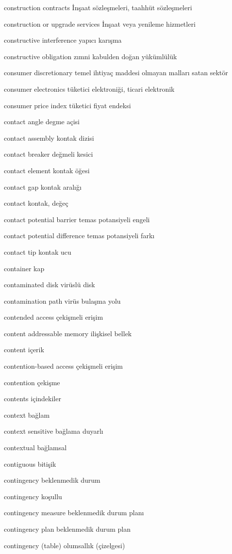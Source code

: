\documentclass[12pt,fleqn]{article}\usepackage{../../common}
\begin{document}
construction contracts İnşaat sözleşmeleri, taahhüt sözleşmeleri

construction or upgrade services İnşaat veya yenileme hizmetleri

constructive interference yapıcı karışma

constructive obligation zımni kabulden doğan yükümlülük

consumer discretionary temel ihtiyaç maddesi olmayan malları satan sektör

consumer electronics tüketici elektroniği, ticari elektronik

consumer price index tüketici fiyat endeksi

contact angle degme açisi

contact assembly kontak dizisi

contact breaker değmeli kesici

contact element kontak öğesi

contact gap kontak aralığı

contact kontak, değeç

contact potential barrier temas potansiyeli engeli

contact potential difference temas potansiyeli farkı

contact tip kontak ucu

container kap

contaminated disk virüslü disk

contamination path virüs bulaşma yolu

contended access çekişmeli erişim

content addressable memory ilişkisel bellek

content içerik

contention-based access çekişmeli erişim

contention çekişme

contents içindekiler

context bağlam

context sensitive bağlama duyarlı

contextual bağlamsal

contiguous bitişik

contingency beklenmedik durum

contingency koşullu

contingency measure beklenmedik durum planı

contingency plan beklenmedik durum plan

contingency (table) olumsallık (çizelgesi)
\end{document}
